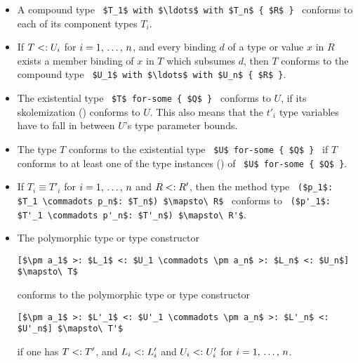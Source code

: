 \begin{itemize}
\item 
A compound type ~\lstinline!$T_1$ with $\ldots$ with $T_n$ { $R$ }!~ conforms to each of its component types $T_i$. 

\item 
If $T <: U_i$ for $i = 1 ,\, \ldots ,\, n$, and every binding $d$ of a type or value $x$ in $R$ exists a member binding of $x$ in $T$ which subsumes $d$, then $T$ conforms to the compound type ~\lstinline!$U_1$ with $\ldots$ with $U_n$ { $R$ }!. 

\item
The existential type ~\lstinline!$T$ for-some { $Q$ }!~ conforms to $U$, if its skolemization () conforms to $U$. This also means that the $t'_i$ type variables have to fall in between $U$'s type parameter bounds. 

\item
The type $T$ conforms to the existential type ~\lstinline!$U$ for-some { $Q$ }!~ if $T$ conforms to at least one of the type instances () of ~\lstinline!$U$ for-some { $Q$ }!. 

\item
If $T_i \equiv T'_i$ for $i = 1 ,\, \ldots ,\, n$ and $R <: R'$, then the method type ~\lstinline!($p_1$: $T_1 \commadots p_n$: $T_n$) $\mapsto\ R$!~ conforms to ~\lstinline!($p'_1$: $T'_1 \commadots p'_n$: $T'_n$) $\mapsto\ R'$!. 

\item
The polymorphic type or type constructor 
\begin{lstlisting}
[$\pm a_1$ >: $L_1$ <: $U_1 \commadots \pm a_n$ >: $L_n$ <: $U_n$] $\mapsto\ T$
\end{lstlisting}
conforms to the polymorphic type or type constructor 
\begin{lstlisting}
[$\pm a_1$ >: $L'_1$ <: $U'_1 \commadots \pm a_n$ >: $L'_n$ <: $U'_n$] $\mapsto\ T'$
\end{lstlisting}
if one has $T <: T'$, and $L_i <: L'_i$ and $U_i <: U'_i$ for $i = 1 ,\, \ldots ,\, n$. 


\end{itemize}
